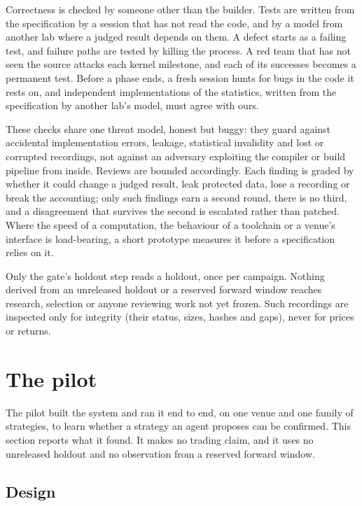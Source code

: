 \documentclass[11pt]{article}
\begin{document}
Correctness is checked by someone other than the builder. Tests are written from the specification by a session that has not read the code, and by a model from another lab where a judged result depends on them. A defect starts as a failing test, and failure paths are tested by killing the process. A red team that has not seen the source attacks each kernel milestone, and each of its successes becomes a permanent test. Before a phase ends, a fresh session hunts for bugs in the code it rests on, and independent implementations of the statistics, written from the specification by another lab's model, must agree with ours.

These checks share one threat model, honest but buggy: they guard against accidental implementation errors, leakage, statistical invalidity and lost or corrupted recordings, not against an adversary exploiting the compiler or build pipeline from inside. Reviews are bounded accordingly. Each finding is graded by whether it could change a judged result, leak protected data, lose a recording or break the accounting; only such findings earn a second round, there is no third, and a disagreement that survives the second is escalated rather than patched. Where the speed of a computation, the behaviour of a toolchain or a venue's interface is load-bearing, a short prototype measures it before a specification relies on it.

Only the gate's holdout step reads a holdout, once per campaign. Nothing derived from an unreleased holdout or a reserved forward window reaches research, selection or anyone reviewing work not yet frozen. Such recordings are inspected only for integrity (their status, sizes, hashes and gaps), never for prices or returns.

\section{The pilot}\label{sec:pilot}

The pilot built the system and ran it end to end, on one venue and one family of strategies, to learn whether a strategy an agent proposes can be confirmed. This section reports what it found. It makes no trading claim, and it uses no unreleased holdout and no observation from a reserved forward window.

\subsection{Design}\label{sec:pilot-design}
\end{document}

